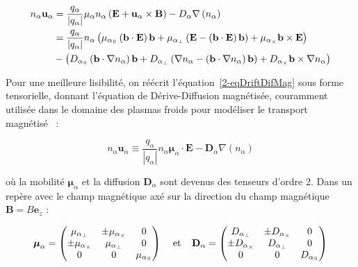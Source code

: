 \begin{refsection}
\begin{equation}
\label{2-eqDriftDifMag}
\begin{split}
n_\alpha\mathbf u_\alpha&=\frac{q_\alpha}{|q_\alpha|}\mu_\alpha
n_\alpha\left(\mathbf E+\mathbf u_\alpha\times\mathbf
B\right)-D_\alpha\nabla\left( n_\alpha\right)
\\
&=\frac{q_\alpha}{|q_\alpha|} n_\alpha\left(\mu_{\alpha_\para}\left(\mathbf
b\cdot\mathbf E\right)\mathbf b+\mu_{\alpha_\perp}\left(\mathbf
E-\left(\mathbf
b\cdot\mathbf E\right)\mathbf
b\right)+\mu_{\alpha_\times}\mathbf
b\times\mathbf E\right)
\\
&-\left(D_{\alpha_\para}\left(\mathbf
b\cdot\nabla n_\alpha\right)\mathbf b+D_{\alpha_\perp}\left(\mathbf
\nabla n_\alpha-\left(\mathbf
b\cdot\nabla n_\alpha\right)\mathbf
b\right)+D_{\alpha_\times}\mathbf
b\times\mathbf \nabla n_\alpha\right)
\end{split}
\end{equation}

Pour une meilleure lisibilité, on réécrit l'équation~\ref{2-eqDriftDifMag}
sous forme tensorielle, donnant l'équation de Dérive-Diffusion magnétisée,
couramment utilisée dans le domaine des plasmas froids pour modéliser le
transport magnétisé~\parencite{HagelaarDeriveDiff, HagelaarProp} :

\begin{equation}
\label{2-eqDriftDifMag2}
n_\alpha\mathbf u_\alpha\equiv
\frac{q_\alpha}{|q_\alpha|} n_\alpha\boldsymbol{\mu}_\alpha\cdot \mathbf
E-\mathbf{D}_\alpha{\nabla\left( n_\alpha\right)}
\end{equation}

où la mobilité $\boldsymbol{\mu}_\alpha$ et la diffusion $\mathbf{D}_\alpha$
sont devenus des tenseurs d'ordre 2. Dans un repère avec le champ magnétique axé
sur la direction du champ magnétique $\mathbf B=B\mathbf e_z$ :

\begin{align}
\boldsymbol{\mu}_\alpha =
 \begin{pmatrix}
  \mu_{\alpha_\perp} & \pm\mu_{\alpha_\times} & 0 \\
  \pm\mu_{\alpha_\times} & \mu_{\alpha_\perp} & 0 \\
  0  & 0  & \mu_{\alpha_\para} 
 \end{pmatrix}\;\;\;\;\text{et}\;\;\;\;
 \mathbf D_\alpha =
 \begin{pmatrix}
  D_{\alpha_\perp} & \pm D_{\alpha_\times} & 0 \\
 \pm D_{\alpha_\times} & D_{\alpha_\perp} & 0 \\
  0  & 0  & D_{\alpha_\para} 
 \end{pmatrix}
\end{align}


\end{refsection}
